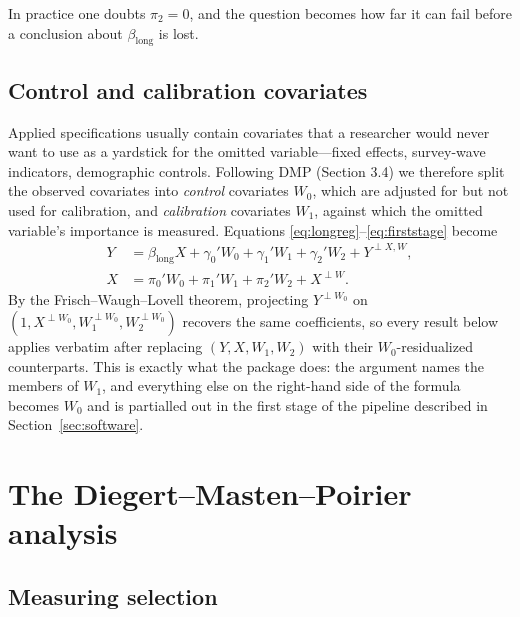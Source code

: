 \documentclass[article]{jss}\usepackage[]{graphicx}\usepackage[]{xcolor}
\newcommand{\blong}{\beta_{\mathrm{long}}}
\begin{document}
In practice one doubts $\pi_2 = 0$, and the question becomes how far it can
fail before a conclusion about $\blong$ is lost.

\subsection{Control and calibration covariates}\label{sec:w0}

Applied specifications usually contain covariates that a researcher would
never want to use as a yardstick for the omitted variable---fixed effects,
survey-wave indicators, demographic controls. Following DMP
(Section 3.4) we therefore split the observed covariates into
\emph{control} covariates $W_0$, which are adjusted for but not used for
calibration, and \emph{calibration} covariates $W_1$, against which the
omitted variable's importance is measured. Equations
\eqref{eq:longreg}--\eqref{eq:firststage} become
\begin{align}
Y &= \blong X + \gamma_0' W_0 + \gamma_1' W_1 + \gamma_2' W_2
     + Y^{\perp X, W}, \\
X &= \pi_0' W_0 + \pi_1' W_1 + \pi_2' W_2 + X^{\perp W}.
\end{align}
By the Frisch--Waugh--Lovell theorem, projecting $Y^{\perp W_0}$ on
$(1, X^{\perp W_0}, W_1^{\perp W_0}, W_2^{\perp W_0})$ recovers the same
coefficients, so every result below applies verbatim after replacing
$(Y, X, W_1, W_2)$ with their $W_0$-residualized counterparts. This is
exactly what the package does: the  argument names the
members of $W_1$, and everything else on the right-hand side of the
formula becomes $W_0$ and is partialled out in the first stage of the
pipeline described in Section~\ref{sec:software}.

\section{The Diegert--Masten--Poirier analysis}\label{sec:dmp}

\subsection{Measuring selection}\label{sec:measuring}
\end{document}

